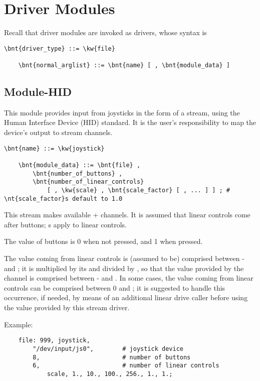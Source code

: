 \section{Driver Modules}
Recall that driver modules are invoked as  drivers,
whose syntax is
\begin{Verbatim}[commandchars=\\\{\}]
    \bnt{driver_type} ::= \kw{file}

    \bnt{normal_arglist} ::= \bnt{name} [ , \bnt{module_data} ]
\end{Verbatim}



\subsection{Module-HID}
This module provides input from joysticks in the form of a stream,
using the Human Interface Device (HID) standard.
It is the user's responsibility to map the device's output to stream channels.

\begin{Verbatim}[commandchars=\\\{\}]
    \bnt{name} ::= \kw{joystick}

    \bnt{module_data} ::= \bnt{file} ,
        \bnt{number_of_buttons} ,
        \bnt{number_of_linear_controls}
            [ , \kw{scale} , \bnt{scale_factor} [ , ... ] ] ; # \nt{scale_factor}s default to 1.0
\end{Verbatim}
This stream makes available  +  channels.
It is assumed that linear controls come after buttons;
s apply to linear controls.

The value of buttons is 0 when not pressed, and 1 when pressed.

The value coming from linear controls is (assumed to be) comprised between - and ;
it is multiplied by its  and divided by , so that the value provided by the channel
is comprised between - and .
In some cases, the value coming from linear controls can be comprised between 0 and ;
it is suggested to handle this occurrence, if needed, by means of an additional linear drive caller
before using the value provided by this stream driver.

Example:
\begin{verbatim}
    file: 999, joystick,
        "/dev/input/js0",        # joystick device
        8,                       # number of buttons
        6,                       # number of linear controls
            scale, 1., 10., 100., 256., 1., 1.;
\end{verbatim}
        
